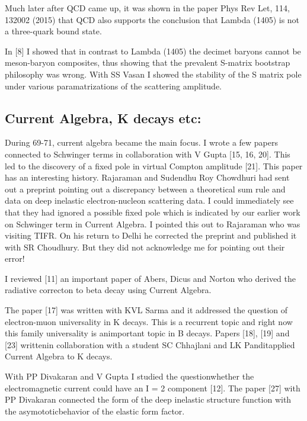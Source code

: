 Much later after QCD came up, it was shown in the paper Phys Rev Let, 
114, 132002 (2015) that QCD also supports the conclusion that Lambda 
(1405) is not a three-quark bound state.

In [8] I showed that in contrast to Lambda (1405) the decimet baryons 
cannot be meson-baryon composites, thus showing that the prevalent 
S-matrix bootstrap philosophy was wrong. With SS Vasan I showed the 
stability of the S matrix pole under various paramatrizations of the 
scattering amplitude.

\vspace{-\topsep}
\subsection*{Current Algebra, K decays etc: }

During 69-71, current algebra became the main focus. I wrote a few 
papers connected to Schwinger terms in collaboration with V Gupta 
[15, 16, 20]. This led to the discovery of a fixed pole in virtual Compton 
amplitude [21]. This paper has an interesting history. Rajaraman and 
Sudendhu Roy Chowdhuri had sent out a preprint pointing out a 
discrepancy between a theoretical sum rule and data on deep inelastic 
electron-nucleon scattering data. I could immediately see that they had 
ignored a possible fixed pole which is indicated by our earlier work on 
Schwinger term in Current Algebra. I pointed this out to Rajaraman who 
was visiting TIFR. On his return to Delhi he corrected the preprint and 
published it with SR Choudhury. But they did not acknowledge me for 
pointing out their error!

I reviewed [11] an important paper of Abers, Dicus and Norton who 
derived the radiative correcton to beta decay using Current Algebra.

The paper [17] was written with KVL Sarma and it addressed the question 
of electron-muon universality in K decays. This is a recurrent topic and 
right now this family universality is an\break important topic in B decays. 
Papers [18], [19] and [23] written\break in collaboration with a student SC 
Chhajlani and LK Pandit\break applied Current Algebra to K decays.

With PP Divakaran and V Gupta I studied the question\break whether the 
electromagnetic current could have an I = 2 compo\-nent [12]. The paper 
[27] with PP Divakaran connected the form of the deep inelastic 
structure function with the asymototic\break behavior of the elastic form 
factor.

